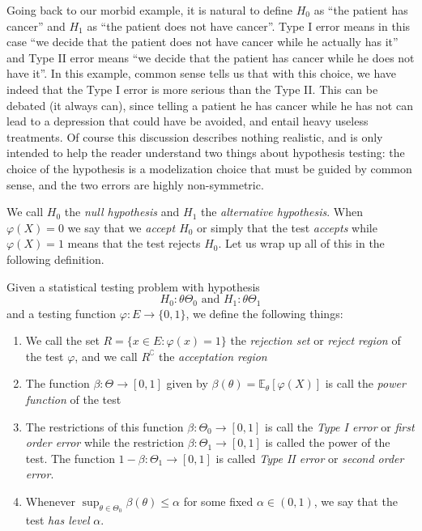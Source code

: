 \documentclass[
	fontsize=11pt, %
	twoside=false, %
	numbers=noenddot, %
]{kaobook}
\newcommand{\E}{\mathbb E}
\newcommand{\goes}{\rightarrow}
\begin{document}
Going back to our morbid example, it is natural to define $H_0$ as ``the patient has cancer'' and $H_1$ as ``the patient does not have cancer''.
Type I error means in this case ``we decide that the patient does not have cancer while he actually has it'' and Type II error means ``we decide that the patient has cancer while he does not have it''.
In this example, common sense tells us that with this choice, we have indeed that the Type I error is more serious than the Type II. 
This can be debated (it always can), since telling a patient he has cancer while he has not can lead to a depression that could have be avoided, and entail heavy useless treatments. 
Of course this discussion describes nothing realistic, and is only intended to help the reader understand two things about hypothesis testing: the choice of the hypothesis is a modelization choice that must be guided by common sense, and the two errors are highly non-symmetric.


We call $H_0$ the \emph{null hypothesis} and $H_1$ the \emph{alternative hypothesis}.
When $\varphi(X) = 0$ we say that we \emph{accept $H_0$} or simply that the test \emph{accepts} while $\varphi(X) = 1$ means that the test rejects $H_0$.
Let us wrap up all of this in the following definition.
\begin{definition}
	Given a statistical testing problem with hypothesis
	\begin{equation*}
		H_0 : \theta \Theta_0 \text{ and } H_1 : \theta \Theta_1
	\end{equation*}
	and a testing function $\varphi : E \goes \{ 0, 1 \}$, we define the following things:
	\begin{enumerate}
		\item We call the set $R = \{ x \in E : \varphi(x) = 1 \}$ the \emph{rejection set} or \emph{reject region} of the test $\varphi$, and we call $R^\complement$ the \emph{acceptation region}
		\item The function $\beta : \Theta \goes [0, 1]$ given by $\beta(\theta) = \E_\theta [\varphi(X)]$ is call the \emph{power function} of the test
		\item The restrictions of this function $\beta : \Theta_0 \goes [0, 1]$ is call the \emph{Type I error} or \emph{first order error} while the restriction $\beta : \Theta_1 \goes [0, 1]$ is called the power of the test. The function $1 - \beta : \Theta_1 \goes [0, 1]$ is called \emph{Type II error} or \emph{second order error}.
		\item Whenever $\sup_{\theta \in \Theta_0} \beta(\theta) \leq \alpha$ for some fixed $\alpha \in (0, 1)$, we say that the test \emph{has level} $\alpha$.
	\end{enumerate}
\end{definition}
\end{document}
